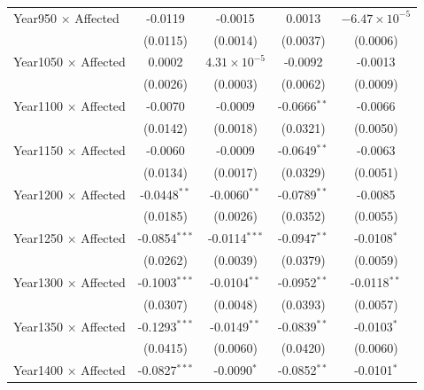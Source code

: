 \begin{table}
\begin{tabular}{lcccc}
   Year950 $\times$ Affected   & -0.0119                & -0.0015                & 0.0013         & $-6.47\times 10^{-5}$\\    
                               & (0.0115)               & (0.0014)               & (0.0037)       & (0.0006)\\   
   Year1050 $\times$ Affected  & 0.0002                 & $4.31\times 10^{-5}$   & -0.0092        & -0.0013\\   
                               & (0.0026)               & (0.0003)               & (0.0062)       & (0.0009)\\   
   Year1100 $\times$ Affected  & -0.0070                & -0.0009                & -0.0666$^{**}$ & -0.0066\\   
                               & (0.0142)               & (0.0018)               & (0.0321)       & (0.0050)\\   
   Year1150 $\times$ Affected  & -0.0060                & -0.0009                & -0.0649$^{**}$ & -0.0063\\   
                               & (0.0134)               & (0.0017)               & (0.0329)       & (0.0051)\\   
   Year1200 $\times$ Affected  & -0.0448$^{**}$         & -0.0060$^{**}$         & -0.0789$^{**}$ & -0.0085\\   
                               & (0.0185)               & (0.0026)               & (0.0352)       & (0.0055)\\   
   Year1250 $\times$ Affected  & -0.0854$^{***}$        & -0.0114$^{***}$        & -0.0947$^{**}$ & -0.0108$^{*}$\\   
                               & (0.0262)               & (0.0039)               & (0.0379)       & (0.0059)\\   
   Year1300 $\times$ Affected  & -0.1003$^{***}$        & -0.0104$^{**}$         & -0.0952$^{**}$ & -0.0118$^{**}$\\   
                               & (0.0307)               & (0.0048)               & (0.0393)       & (0.0057)\\   
   Year1350 $\times$ Affected  & -0.1293$^{***}$        & -0.0149$^{**}$         & -0.0839$^{**}$ & -0.0103$^{*}$\\   
                               & (0.0415)               & (0.0060)               & (0.0420)       & (0.0060)\\   
   Year1400 $\times$ Affected  & -0.0827$^{***}$        & -0.0090$^{*}$          & -0.0852$^{**}$ & -0.0101$^{*}$\\   

\end{tabular}
\end{table}
